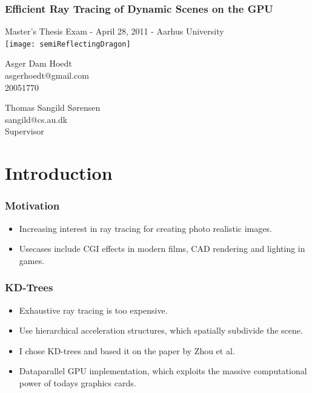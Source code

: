 \documentclass{beamer}
\begin{document}

\begin{frame}
  \begin{center}
    \frametitle{Efficient Ray Tracing of Dynamic Scenes on the GPU}
    \footnotesize
    Master's Thesis Exam - April 28, 2011 - Aarhus University
    \vspace*{15pt}\\
    \texttt{[image: semiReflectingDragon]}
    \vspace*{20pt}
    \\
    \begin{minipage}{0.4\textwidth}
      \centering
      Asger Dam Hoedt \\ asgerhoedt@gmail.com \\ 20051770
    \end{minipage}
    \begin{minipage}{0.4\textwidth}
      \centering
      Thomas Sangild Sørensen \\ sangild@cs.au.dk \\ Supervisor
    \end{minipage}
  \end{center}
\end{frame}

\section{Introduction}
\begin{frame}
  \frametitle{Motivation}

  \begin{itemize}
  \item Increasing interest in ray tracing for creating photo realistic images.
  \item Usecases include CGI effects in modern films, CAD rendering and lighting
    in games.
  \end{itemize}
\end{frame}

\begin{frame}
  \frametitle{KD-Trees}

  \begin{itemize}
    \item Exhaustive ray tracing is too expensive.
    \item Use hierarchical acceleration structures, which spatially subdivide
      the scene.
    \item I chose KD-trees and based it on the paper by Zhou et al.
    \item Dataparallel GPU implementation, which exploits the massive
      computational power of todays graphics cards.
  \end{itemize}
\end{frame}
\end{document}
